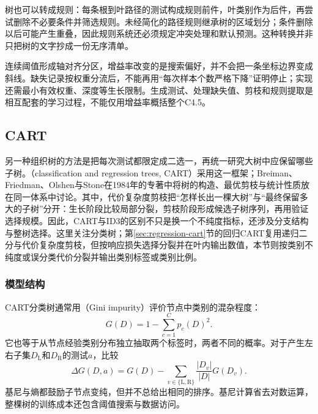 树也可以转成规则：每条根到叶路径的测试构成规则前件，叶类别作为后件，再尝试删除不必要条件并筛选规则。未经简化的路径规则继承树的区域划分；条件删除以后可能产生重叠，因此规则系统还必须规定冲突处理和默认预测。这种转换并非只把树的文字抄成一份无序清单。

连续阈值形成轴对齐分区，增益率改变的是搜索偏好，并不会把一条坐标边界变成斜线。缺失记录按权重分流后，不能再用“每次样本个数严格下降”证明停止；实现还需最小有效权重、深度等生长限制。生成测试、处理缺失值、剪枝和规则提取是相互配套的学习过程，不能仅用增益率概括整个C4.5。

\subsection{CART}
\label{sec:classification-cart}

另一种组织树的方法是把每次测试都限定成二选一，再统一研究大树中应保留哪些子树。（classification and regression trees, CART）采用这一框架；Breiman、Friedman、Olshen与Stone在1984年的专著中将树的构造、最优剪枝与统计性质放在同一体系中讨论。其中，代价复杂度剪枝把“怎样长出一棵大树”与“最终保留多大的子树”分开：生长阶段比较局部分裂，剪枝阶段形成候选子树序列，再用验证选择规模。因此，CART与ID3的区别不只是换一个不纯度指标，还涉及分支结构与整树选择。这里关注分类树；第\ref{sec:regression-cart}节的回归CART复用递归二分与代价复杂度剪枝，但按响应损失选择分裂并在叶内输出数值，本节则按类别不纯度或误分类代价分裂并输出类别标签或类别比例。

\subsubsection{模型结构}
\label{sec:classification-cart-structure}

CART分类树通常用（Gini impurity）评价节点中类别的混杂程度：
\begin{equation}
  G(D)=1-\sum_{c=1}^{C}p_c(D)^2.
  \label{eq:classification-gini}
\end{equation}
它也等于从节点经验类别分布独立抽取两个标签时，两者不同的概率。对于产生左右子集$D_{\mathrm{L}}$和$D_{\mathrm{R}}$的测试$a$，比较
\begin{equation}
  \Delta G(D,a)=G(D)
  -\sum_{v\in\{\mathrm{L},\mathrm{R}\}}
  \frac{|D_v|}{|D|}G(D_v).
  \label{eq:classification-gini-decrease}
\end{equation}
基尼与熵都鼓励子节点变纯，但并不总给出相同的排序。基尼计算省去对数运算，整棵树的训练成本还包含阈值搜索与数据访问。


